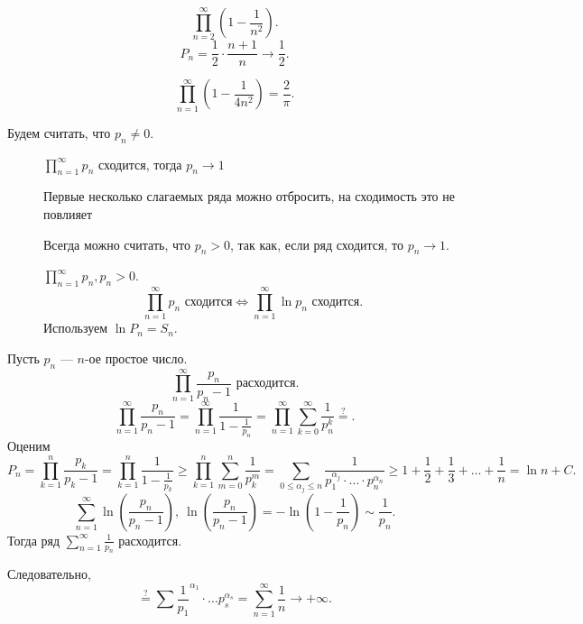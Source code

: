 \begin{ex}
    \[
	\prod_{n=2}^{\infty}\left(1- \frac{1}{n^2}\right)
    .\] 
    \[
	P_n = \frac{1}{2}\cdot \frac{n+1}{n} \to  \frac{1}{2}
    .\] 
\end{ex}
\begin{ex}
    \[
	\prod_{n=1}^{\infty} \left( 1 - \frac{1}{4n^2} \right)  = \frac{2}{\pi}
    .\] 
\end{ex}
\begin{prop}
    Будем считать, что $ p_n \ne 0$.
    \begin{description}
	\item[]  $ \prod_{n=1}^{\infty} p_n$ сходится, тогда $ p_n \to  1$ 
	\item[]  Первые несколько слагаемых ряда можно отбросить, на сходимость это не повлияет
	\item[] Всегда можно считать, что $ p_n > 0$, так как, если ряд сходится, то $ p_n \to  1$.
	\item[] $ \prod_{n=1}^{\infty}p_n, p_n >0$. 
	    \[
	    \prod_{n=1}^{\infty} p_n \text{ сходится} \Longleftrightarrow \prod_{n=1}^{\infty} \ln p_n \text{ сходится}
	    .\] 
	    Используем $ \ln P_n = S_n$.
    \end{description}
\end{prop}
\begin{ex}
    Пусть $ p_n$ --- $ n$-ое простое число. 
    \[
	\prod _{n=1}^{\infty} \frac{p_n}{p_n-1} \text{ расходится}
    .\] 
    \[
	\prod_{n=1}^{\infty} \frac{p_n}{p_n -1}= \prod_{n=1}^{\infty} \frac{1}{1- \frac{1}{p_n}} = \prod_{n=1}^{\infty}\sum_{k=0}^{\infty} \frac{1}{p_n^{k}} \stackrel{?}{=}
    .\] 
    Оценим
    \[
	P_n =  \prod_{k=1}^{n} \frac{p_k}{p_k -1} = \prod _{k=1}^{n} \frac{1}{1-\frac{1}{p_k}} \ge \prod _{k=1}^{n} \sum_{m=0}^{n} \frac{1}{p_k^{m}} = \sum_{0 \le \alpha_j \le  n }^{}  \frac{1}{p_1^{ \alpha _j} \cdot  \ldots  \cdot  p_n^{ \alpha _n}} \ge 1 + \frac{1}{2} + \frac{1}{3} + \ldots +\frac{1}{n} = \ln n + C
    .\] 
    \[
	\sum_{n=1}^{\infty} \ln\left( \frac{p_n}{p_n-1} \right) , ~ \ln\left( \frac{p_n}{p_n -1} \right) = - \ln\left( 1- \frac{1}{p_n} \right) \sim \frac{1}{p_n}
    .\] 
    Тогда ряд $ \sum_{n=1}^{\infty} \frac{1}{p_n}$ расходится.

   Следовательно,
   \[
   \stackrel{?}{=} \sum_{}^{} \frac{1}{p_1}^{ \alpha _1} \cdot  \ldots  p_s ^{ \alpha _s} = \sum_{n=1}^{\infty} \frac{1}{n} \to  +\infty
   .\] 
\end{ex}
% 

